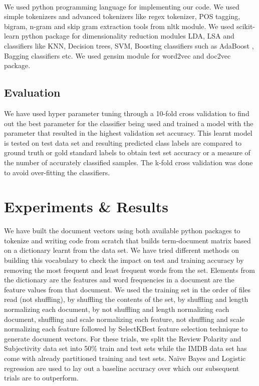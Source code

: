 \documentclass[a4paper,26pt]{article}
\begin{document}
\paragraph{}
We used python programming language for implementing our code. We used simple tokenizers and advanced tokenizers like regex tokenizer, POS tagging, bigram, n-gram and skip gram extraction tools from nltk module. We used scikit-learn python package for dimensionality reduction modules LDA, LSA and classifiers like KNN, Decision trees, SVM, Boosting classifiers such as AdaBoost , Bagging classifiers etc. We used gensim module for word2vec and doc2vec package.

\subsection{Evaluation}
We have used hyper parameter tuning through a 10-fold cross validation to find out the best parameter for the classifier being used and trained a model with the parameter that resulted in the highest validation set accuracy. This learnt model is tested on test data set and resulting predicted class labels are compared to ground truth or gold standard labels to obtain test set accuracy or a measure of the number of accurately classified samples. The k-fold cross validation was done to avoid over-fitting the classifiers.

\section{Experiments \& Results}
We have built the document vectors using both available python packages to tokenize and writing code from scratch that builds term-document matrix based on a dictionary learnt from the data set. We have tried different methods on building this vocabulary to check the impact on test and training accuracy by removing the most frequent and least frequent words from the set. Elements from the dictionary are the features and word frequencies in a document are the feature values from that document. We used the training set in the order of files read (not shuffling), by shuffling the contents of the set, by shuffling and length normalizing each document, by not shuffling and length normalizing each document, shuffling and scale normalizing each feature, not shuffling and scale normalizing each feature followed by SelectKBest feature selection technique to generate document vectors. For these trials, we split the Review Polarity and Subjectivity data set into 50\% train and test sets while the IMDB data set has come with already partitioned training and test sets. Naïve Bayes and Logistic regression are used to lay out a baseline accuracy over which our subsequent trials are to outperform.
\end{document}
